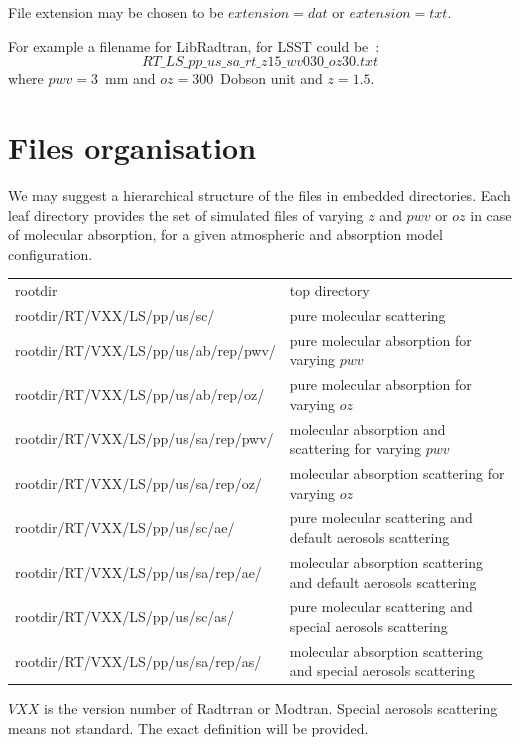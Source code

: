 \documentclass[a4paper]{article}
\begin{document}
File extension may be chosen to be $extension=dat$ or $extension=txt$.

For example a filename for LibRadtran, for LSST could be~:
\begin{equation}
RT\_LS\_pp\_us\_sa\_rt\_z15\_wv030\_oz30.txt  \nonumber
\end{equation}
where $pwv=3$~mm and $oz=300$~Dobson unit and $z=1.5$.


\section{Files organisation}
We may suggest a hierarchical structure  of the files in embedded directories.
Each leaf directory provides the set of simulated files of varying $z$ and $pwv$ or $oz$ in case of molecular absorption, for a given atmospheric and absorption model configuration.

\begin{table}[h]
{\small
\begin{tabular}{ l l}
  rootdir &  top directory \\
 rootdir/RT/VXX/LS/pp/us/sc/ & pure molecular scattering \\
 rootdir/RT/VXX/LS/pp/us/ab/rep/pwv/ & pure molecular absorption for varying $pwv$ \\
 rootdir/RT/VXX/LS/pp/us/ab/rep/oz/ & pure molecular absorption for varying $oz$ \\
 rootdir/RT/VXX/LS/pp/us/sa/rep/pwv/ & molecular absorption and scattering for varying $pwv$ \\
 rootdir/RT/VXX/LS/pp/us/sa/rep/oz/ & molecular absorption scattering for varying $oz$ \\
 rootdir/RT/VXX/LS/pp/us/sc/ae/ & pure molecular scattering and default aerosols scattering \\
 rootdir/RT/VXX/LS/pp/us/sa/rep/ae/ & molecular absorption scattering and default aerosols scattering \\
 rootdir/RT/VXX/LS/pp/us/sc/as/ & pure molecular scattering and special aerosols scattering \\
 rootdir/RT/VXX/LS/pp/us/sa/rep/as/ & molecular absorption scattering and special aerosols scattering \\
\end{tabular}
}
\end{table}
$VXX$ is the version number of Radtrran or Modtran.
Special aerosols scattering means not standard. The exact definition will be provided.
\end{document}
